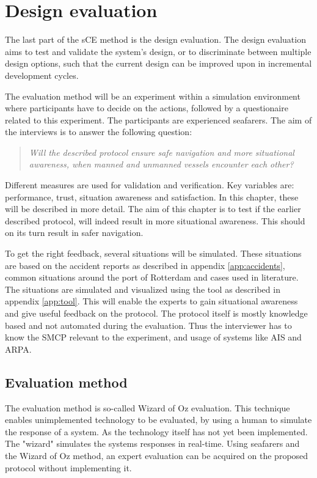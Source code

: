 \chapter{Design evaluation}
\label{ch:evaluation}
The last part of the sCE method is the design evaluation. The design evaluation aims to test and validate the system’s design, or to discriminate between multiple design options, such that the current design can be improved upon in incremental development cycles. 

The evaluation method will be an experiment within a simulation environment where participants have to decide on the actions, followed by a questionaire related to this experiment. The participants are experienced seafarers. The aim of the interviews is to answer the following question:
\begin{quotation}
	\emph{Will the described protocol ensure safe navigation and more situational awareness, when manned and unmanned vessels encounter each other?}
\end{quotation}
Different measures are used for validation and verification. Key variables are: performance, trust, situation awareness and satisfaction. In this chapter, these will be described in more detail. The aim of this chapter is to test if the earlier described protocol, will indeed result in more situational awareness. This should on its turn result in safer navigation.

To get the right feedback, several situations will be simulated. These situations are based on the accident reports as described in appendix \ref{app:accidents}, common situations around the port of Rotterdam and cases used in literature. The situations are simulated and visualized using the tool as described in appendix \ref{app:tool}. This will enable the experts to gain situational awareness and give useful feedback on the protocol. The protocol itself is mostly knowledge based and not automated during the evaluation. Thus the interviewer has to know the \acf{SMCP} relevant to the experiment, and usage of systems like \acf{AIS} and \acf{ARPA}.

\section{Evaluation method}
The evaluation method is so-called Wizard of Oz evaluation. This technique enables unimplemented technology to be evaluated, by using a human to simulate the response of a system. As the technology itself has not yet been implemented. The "wizard" simulates the systems responses in real-time. Using seafarers and the Wizard of Oz method, an expert evaluation can be acquired on the proposed protocol without implementing it.

